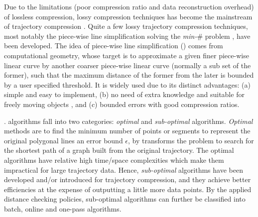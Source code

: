 Due to the  limitations (poor compression ratio and data reconstruction overhead) of lossless compression, lossy compression techniques has become the mainstream of trajectory compression \cite{Lin:Operb,Zhang:Evaluation}. Quite a few lossy trajectory compression techniques, most notably the piece-wise line simplification \cite{Douglas:Peucker, Hershberger:Speeding, Keogh:online,Liu:BQS, Muckell:Compression, Chen:Trajectory, Chen:Fast, Cao:Spatio, Shi:Survey} solving the \emph{min-$\#$} problem \cite{Chan:Optimal, Imai:Optimal,Pavlidis:Segment}, have been developed. The idea of piece-wise line simplification (\lsa) comes from computational geometry, whose target is to approximate a given finer piece-wise linear curve by another coarser piece-wise linear curve ({normally a sub set of the former}), such that the maximum distance of the former from the later is bounded by a user specified threshold. It is widely used due to its distinct advantages: (a) simple and easy to implement, (b) no need of extra knowledge and suitable for freely  moving  objects \cite{Popa:Spatio}, and (c) bounded errors with good compression ratios.

%


. \lsa algorithms fall into two categories: \textit{optimal} and \textit{sub-optimal} algorithms.
\textit{Optimal} methods\cite{Imai:Optimal,Chan:Optimal} are to find the minimum number of points or segments to represent the original polygonal lines \wrt an error bound $\epsilon$, by transforms the problem to search for the shortest path of a graph built from the original trajectory.
The optimal \lsa algorithms have relative high time/space complexities which make them impractical for large trajectory data.
Hence, \textit{sub-optimal} \lsa algorithms have been developed and/or introduced for trajectory compression, and they achieve better efficiencies at the expense of outputting a little more data points. By the applied distance checking policies, sub-optimal algorithms can further be classified into
batch, online and one-pass algorithms.


